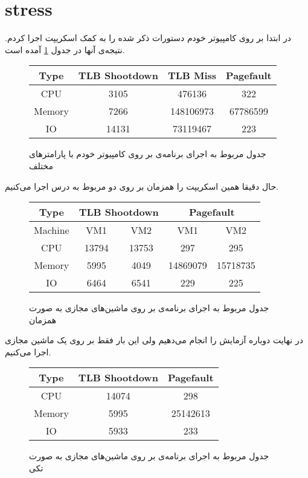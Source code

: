 \section{stress}
در ابتدا بر روی کامپیوتر خودم دستورات ذکر شده را به کمک اسکریپت
اجرا کردم. نتیجه‌ی آنها در جدول
\ref{table:bare_metal_stress}
آمده است.
\begin{figure}[H]
    \begin{latin}
        \centering
        \begin{tabular}{|c|ccc|}
        \hline
        Type & TLB Shootdown & TLB Miss & Pagefault\\
        \hline
        CPU & 3105 & 476136 & 322\\
        \hline
        Memory & 7266&148106973&67786599\\
        \hline
        IO & 14131 & 73119467 & 223\\
        \hline
        \end{tabular}
    \end{latin}
    \caption{جدول مربوط به اجرای برنامه‌ی  بر روی کامپیوتر خودم با پارامتر‌های مختلف}
    \label{table:bare_metal_stress}
\end{figure}
حال دقیقا همین اسکریپت را همزمان بر روی دو
مربوط به درس اجرا می‌کنیم.
\begin{figure}[H]
    \begin{latin}
        \centering
        \begin{tabular}{|c|cccc|}
        \hline
        Type & \multicolumn{2}{c}{TLB Shootdown} & \multicolumn{2}{c|}{Pagefault}\\
        \hline
        Machine & VM1 & VM2 & VM1 & VM2\\
        \hline
        CPU & 13794 & 13753 & 297 & 295\\
        \hline
        Memory & 5995 & 4049 & 14869079 & 15718735\\
        \hline
        IO & 6464 & 6541 & 229 & 225\\
        \hline
        \end{tabular}
    \end{latin}
    \caption{جدول مربوط به اجرای برنامه‌ی  بر روی ماشین‌های مجازی به صورت همزمان}
    \label{table:vm_stress}
\end{figure}
در نهایت دوباره آزمایش را انجام می‌دهیم ولی این بار فقط بر روی یک ماشین مجازی اجرا می‌کنیم.
\begin{figure}[H]
    \begin{latin}
        \centering
        \begin{tabular}{|c|cc|}
        \hline
        Type & TLB Shootdown & Pagefault\\
        \hline
        CPU & 14074 & 298\\
        \hline
        Memory & 5995 & 25142613\\
        \hline
        IO & 5933 & 233\\
        \hline
        \end{tabular}
    \end{latin}
    \caption{جدول مربوط به اجرای برنامه‌ی  بر روی ماشین‌های مجازی به صورت تکی}
    \label{table:vm_stress_single}
\end{figure}
